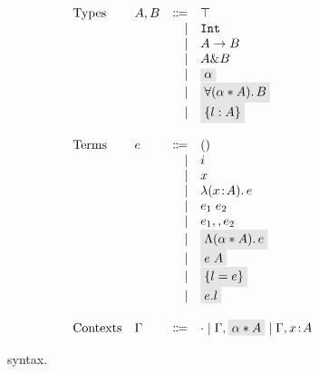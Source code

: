 \begin{figure}[t]
  \[
    \begin{array}{l}
      \begin{array}{llrll}
        \text{Types}
        & A, B & \Coloneqq & \top                        & \\
        &      & \mid & \tyint                           & \\
        &      & \mid & A \to B                          & \\
        &      & \mid & A \inter B                       & \\
        &      & \mid & \highlight{$\alpha$}             & \\
        &      & \mid & \highlight{$\fordis \alpha A B$} & \\
        &      & \mid & \highlight{$\recordType l A$}    & \\

        \\
        \text{Terms}
        & e & \Coloneqq & ()                           & \\
        &   & \mid & i                                 & \\
        &   & \mid & x                                 & \\
        &   & \mid & \lamty x A e                      & \\
        &   & \mid & \app {e_1} {e_2}                  & \\
        &   & \mid & e_1 \mergeop e_2                  & \\
        &   & \mid & \highlight{$\blamdis \alpha A e$} & \\
        &   & \mid & \highlight{$\tapp e A$}           & \\
        &   & \mid & \highlight{$\recordCon l e$}      & \\
        &   & \mid & \highlight{$\recordProj e l$}     & \\

        \\
        \text{Contexts}
        & \Gamma & \Coloneqq & \cdot
                   \mid \Gamma, \highlight{$\alpha \disjoint A$}
                   \mid \Gamma, x \oftype A  & \\
      \end{array}
    \end{array}
  \]

  \caption{\name syntax.}
  \label{fig:fi-syntax}
\end{figure}

